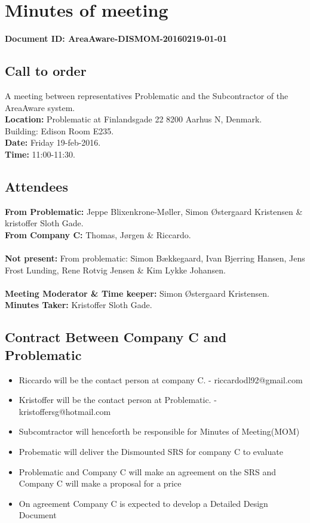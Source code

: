 %
\thispagestyle{fancy}
\chapter*{Minutes of meeting}
\textbf{Document ID: AreaAware-DISMOM-20160219-01-01}


\section*{Call to order}
A meeting between representatives Problematic and the Subcontractor of the AreaAware system.\\
\textbf{Location:} Problematic at Finlandsgade 22 8200 Aarhus N, Denmark.\\ Building: Edison Room E235.\\
\textbf{Date:} Friday 19-feb-2016. \\
\textbf{Time:} 11:00-11:30.
\section*{Attendees}
\textbf{From Problematic:} Jeppe Blixenkrone-Møller, Simon Østergaard Kristensen \& kristoffer Sloth Gade.\\
\textbf{From Company C:} Thomas, Jørgen \& Riccardo.\\\\
\textbf{Not present:} From problematic: Simon Bækkegaard, Ivan Bjerring Hansen, Jens Frost Lunding, Rene Rotvig Jensen \& Kim Lykke Johansen.\\\\
\textbf{Meeting Moderator \& Time keeper:} Simon Østergaard Kristensen. \\
\textbf{Minutes Taker:} Kristoffer Sloth Gade.

\section*{Contract Between Company C and Problematic}
\begin{itemize}
	\item Riccardo will be the contact person at company C. - riccardodl92@gmail.com
	\item Kristoffer will be the contact person at Problematic. - kristoffersg@hotmail.com
	\item Subcomtractor will henceforth be responsible for Minutes of Meeting(MOM)
	\item Probematic will deliver the Dismounted SRS for company C to evaluate
	\item Problematic and Company C will make an agreement on the SRS and Company C will make a proposal for a price
	\item On agreement Company C is expected to develop a Detailed Design Document
\end{itemize}


